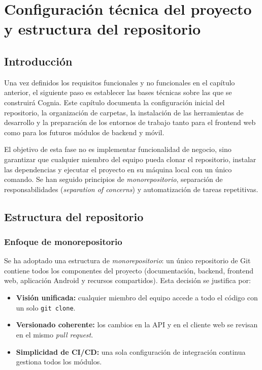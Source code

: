 \documentclass[12pt,a4paper]{report}
\begin{document}
\chapter{Configuración técnica del proyecto y estructura del repositorio}

\section{Introducción}

Una vez definidos los requisitos funcionales y no funcionales en el capítulo anterior, el siguiente paso es establecer las bases técnicas sobre las que se construirá Cognia. Este capítulo documenta la configuración inicial del repositorio, la organización de carpetas, la instalación de las herramientas de desarrollo y la preparación de los entornos de trabajo tanto para el frontend web como para los futuros módulos de backend y móvil.

El objetivo de esta fase no es implementar funcionalidad de negocio, sino garantizar que cualquier miembro del equipo pueda clonar el repositorio, instalar las dependencias y ejecutar el proyecto en su máquina local con un único comando. Se han seguido principios de \textit{monorepositorio}, separación de responsabilidades (\textit{separation of concerns}) y automatización de tareas repetitivas.

\section{Estructura del repositorio}

\subsection{Enfoque de monorepositorio}

Se ha adoptado una estructura de \textit{monorepositorio}: un único repositorio de Git contiene todos los componentes del proyecto (documentación, backend, frontend web, aplicación Android y recursos compartidos). Esta decisión se justifica por:

\begin{itemize}
    \item \textbf{Visión unificada:} cualquier miembro del equipo accede a todo el código con un solo \texttt{git clone}.
    \item \textbf{Versionado coherente:} los cambios en la API y en el cliente web se revisan en el mismo \textit{pull request}.
    \item \textbf{Simplicidad de CI/CD:} una sola configuración de integración continua gestiona todos los módulos.
\end{itemize}
\end{document}
